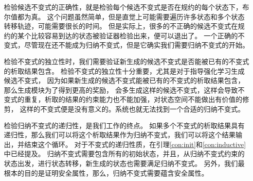 检验候选不变式的正确性，就是检验每个候选不变式是否在规约的每个状态下，布尔值都为真。
这个问题虽然简单，但是直觉上可能需要遍历许多状态和多个状态转移轨迹，可能需要很长的时间。
但是实际上，很多的不正确的候选不变式在规约的某个比较容易到达的状态被验证器检验出来，便可以退出了。
一个正确的不变式，尽管现在还不能成为归纳不变式，但是它确实我们需要归纳不变式的开始。

检验不变式的独立性时，我们需要验证新生成的候选不变式是否能被已有的不变式的析取结果包含。
检验不变式的独立性十分重要，尤其是对于指导强化学习生成候选不变式，
因为如果新生成的候选不变式能被已有的不变式的析取结果包含，那么生成模块为了得到更高的奖励，
会多生成这样的候选不变式，这样会导致不变式的重复，析取的结果的约束能力也不能加强，对状态空间不能做出有价值的修剪，
这样的不变式便是没有意义的。系统也就无法找到一个合适的归纳不变式。

检验归纳不变式的递归性，是我们工作的终点。
如果多个不变式的析取结果具有递归性，那么我们可以将这个析取结果作为归纳不变式，我们可以将这个结果输出，并结束这个循环。
对于不变式的递归性质，在引理\ref{con:init}和\ref{con:inductive}中已经提及。
归纳不变式需要包含所有的初始状态，并且，从归纳不变式约束的状态出发，进行状态转移，新生成的状态也需要满足归纳不变式。
另外，我们最根本的目的是证明安全属性，那么，归纳不变式需要蕴含安全属性。


